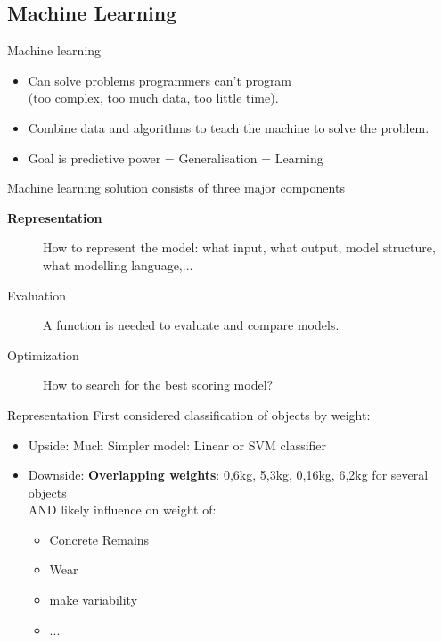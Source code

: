 \documentclass{beamer}
\begin{document}
\subsection{Machine Learning}
\begin{frame}
{\Large Machine learning}
\begin{itemize}
 \item Can solve problems programmers can't program \\ (too complex, too much data, too little time). 
 \item Combine data and algorithms to teach the machine to solve the problem.
 \item Goal is predictive power = Generalisation = Learning
\end{itemize}
\end{frame}


\begin{frame}
 {\large Machine learning solution consists of three major components}
\begin{description}
 \item[\textbf{Representation}] How to represent the model: what input, what output, model structure, what modelling language,...
 \item[Evaluation] A function is needed to evaluate and compare models. 
 \item[Optimization] How to search for the best scoring model?
\end{description}
\end{frame}


\begin{frame}{Representation}
First considered classification of objects by weight:
\begin{itemize}
 \item Upside: Much Simpler model: Linear or SVM classifier
 \item Downside: \textbf{Overlapping weights}: 0,6kg, 5,3kg, 0,16kg, 6,2kg for several objects \\
  AND likely influence on weight of:
  \begin{itemize}
    \item Concrete Remains
    \item Wear
    \item make variability
    \item ...
  \end{itemize}
\end{itemize}
\end{frame}
\end{document}
